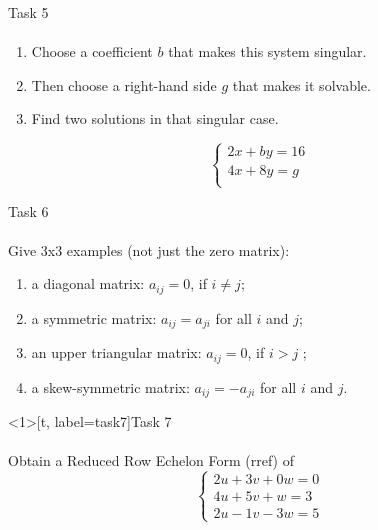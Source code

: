 \documentclass[aspectratio=169]{beamer}
\begin{document}
\begin{frame}[t]{Task 5}
\framesubtitle{}
    \begin{enumerate}
        \item Choose a coefficient $b$ that makes this system singular.
        \item Then choose a right-hand side $g$ that makes it solvable.
        \item Find two solutions in that singular case.
    \end{enumerate}
    \begin{equation*}
        \left\{\begin{matrix}
            2x + by = 16 \\ 
            4x + 8y = g \\ 
            \end{matrix}\right.
    \end{equation*}    
\end{frame}

\begin{frame}[t]{Task 6}
\framesubtitle{}
    Give 3x3 examples (not just the zero matrix):
    \begin{enumerate}
        \item a diagonal matrix: $a_{ij}=0$, if $i \neq j$;
        \item a symmetric matrix: $a_{ij} = a_{ji}$ for all $i$ and $j$;
        \item an upper triangular matrix: $a_{ij}=0$, if $i>j$ ;
        \item a skew-symmetric matrix: $a_{ij} = -a_{ji}$ for all $i$ and $j$.
    \end{enumerate}
\end{frame}

\begin{frame}<1>[t, label=task7]{Task 7}
\framesubtitle{}
    Obtain a Reduced Row Echelon Form (rref) of
    \begin{equation*}
        \left\{\begin{matrix}
            2u + 3v + 0w = 0 \\ 
            4u + 5v + w = 3 \\ 
            2u - 1v - 3w = 5 
            \end{matrix}\right.
        \end{equation*}

\end{frame}
\end{document}
